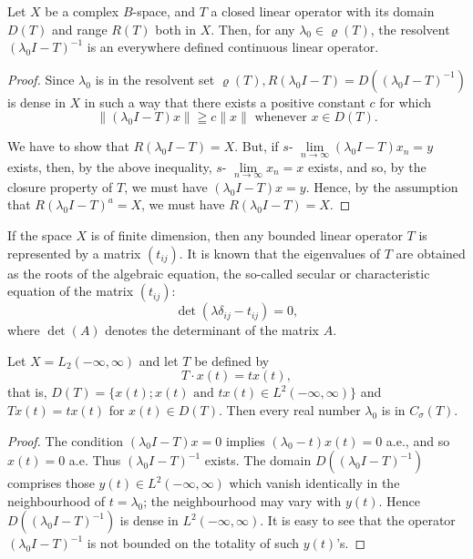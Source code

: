 \begin{theoremu} Let $X$ be a complex $B$-space, and $T$ a closed linear operator with its domain $D(T)$ and range $R(T)$ both in $X$. Then, for any $\lambda_{0} \in \varrho(T)$, the resolvent $(\lambda_{0}I - T)^{-1}$ is an everywhere defined continuous linear operator. 
\end{theoremu}

\begin{proof}
 Since $\lambda_0$ is in the resolvent set $\varrho(T), R(\lambda_0 I - T) = D((\lambda_0 I - T)^{-1})$ is dense in $X$ in such a way that there exists a positive constant $c$ for which 
\[
\left\| \left(\lambda_{0} I - T\right) x \right\| \geqq c \| x \| \text{ whenever } x \in D (T).
\]

We have to show that $R(\lambda_0 I - T) = X$. But, if $s\text{- }\lim\limits_{n \to \infty} (\lambda_0 I - T)x_n = y$ exists, then, by the above inequality, $s\text{- }\lim\limits_{n \to \infty} x_n = x$ exists, and so, by the closure property of $T$, we must have $(\lambda_0 I - T)x = y$. Hence, by the assumption that $R(\lambda_0 I - T)^a = X$, we must have $R(\lambda_0 I - T) = X$. 
\end{proof}

\begin{example}\label{ex:VIII.1.Example.1} If the space $X$ is of finite dimension, then any bounded linear operator $T$ is represented by a matrix $(t_{ij})$. It is known that the eigenvalues of $T$ are obtained as the roots of the algebraic equation, the so-called secular or characteristic equation of the matrix $(t_{ij})$: 
\begin{equation}\label{eq:VIII.1.1}
\det \left(\lambda \delta_{ij} - t _{ij}\right) = 0,
\end{equation}
where $\det(A)$ denotes the determinant of the matrix $A$. 
\end{example}

\begin{example}\label{ex:VIII.1.Example.2} Let $X = L_{2}(-\infty, \infty)$ and let $T$ be defined by 
\[
T \cdot x (t) = t x (t),
\]
that is, $D(T) = \{x(t); x(t) \text{ and } tx(t) \in L^2(-\infty, \infty)\}$ and $Tx(t) = tx(t)$ for $x(t) \in D(T)$. Then every real number $\lambda_0$ is in $C_\sigma(T)$. 
\end{example}

\begin{proof}
 The condition $(\lambda_{0}I-T)x=0$ implies $(\lambda_{0}-t)x(t)=0$ a.e., and so $x(t)=0$ a.e. Thus $(\lambda_{0}I-T)^{-1}$ exists. The domain $D((\lambda_{0}I-T)^{-1})$ comprises those $y(t)\in L^{2}(-\infty,\infty)$ which vanish identically in the neighbourhood of $t=\lambda_{0}$; the neighbourhood may vary with $y(t)$. Hence $D((\lambda_{0}I-T)^{-1})$ is dense in $L^{2}(-\infty,\infty)$. It is easy to see that the operator $(\lambda_{0}I-T)^{-1}$ is not bounded on the totality of such $y(t)$'s. 
\end{proof}

